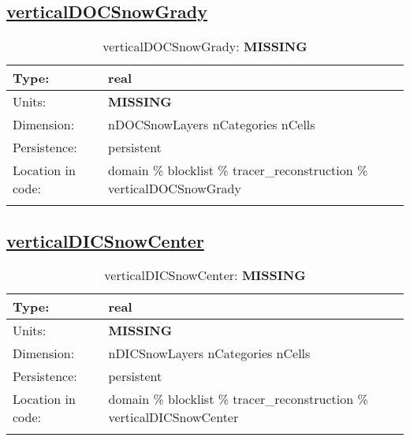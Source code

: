 \subsection[verticalDOCSnowGrady]{\hyperref[sec:var_tab_tracer_reconstruction]{verticalDOCSnowGrady}}
\label{subsec:var_sec_tracer_reconstruction_verticalDOCSnowGrady}
\begin{center}
\begin{longtable}{| p{2.0in} | p{4.0in} |}
        \hline 
        Type: & real \\
        \hline 
        Units: & {\bf \color{red} MISSING} \\
        \hline 
        Dimension: & nDOCSnowLayers nCategories nCells \\
        \hline 
        Persistence: & persistent \\
        \hline 
         Location in code: & domain \% blocklist \% tracer\_reconstruction \% verticalDOCSnowGrady \\
         \hline 
    \caption{verticalDOCSnowGrady: {\bf \color{red} MISSING}}
\end{longtable}
\end{center}
\subsection[verticalDICSnowCenter]{\hyperref[sec:var_tab_tracer_reconstruction]{verticalDICSnowCenter}}
\label{subsec:var_sec_tracer_reconstruction_verticalDICSnowCenter}
\begin{center}
\begin{longtable}{| p{2.0in} | p{4.0in} |}
        \hline 
        Type: & real \\
        \hline 
        Units: & {\bf \color{red} MISSING} \\
        \hline 
        Dimension: & nDICSnowLayers nCategories nCells \\
        \hline 
        Persistence: & persistent \\
        \hline 
         Location in code: & domain \% blocklist \% tracer\_reconstruction \% verticalDICSnowCenter \\
         \hline 
    \caption{verticalDICSnowCenter: {\bf \color{red} MISSING}}
\end{longtable}
\end{center}
